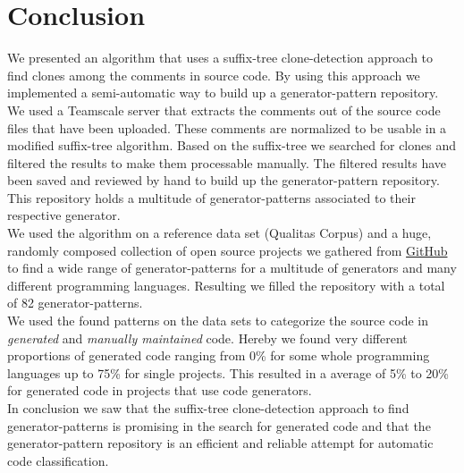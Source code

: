 
\chapter{Conclusion}\label{chapter:conclusion}
We presented an algorithm that uses a suffix-tree clone-detection approach to find clones among the comments in source code. By using this approach we implemented a semi-automatic way to build up a generator-pattern repository.\\
We used a Teamscale server that extracts the comments out of the source code files that have been uploaded. These comments are normalized to be usable in a modified suffix-tree algorithm. Based on the suffix-tree we searched for clones and filtered the results to make them processable manually. The filtered results have been saved and reviewed by hand to build up the generator-pattern repository. This repository holds a multitude of generator-patterns associated to their respective generator.\\
We used the algorithm on a reference data set (Qualitas Corpus) and a huge, randomly composed collection of open source projects we gathered from \href{https://github.com}{GitHub} to find a wide range of generator-patterns for a multitude of generators and many different programming languages. Resulting we filled the repository with a total of 82 generator-patterns.\\
We used the found patterns on the data sets to categorize the source code in \textit{generated} and \textit{manually maintained} code. Hereby we found very different proportions of generated code ranging from 0\% for some whole programming languages up to 75\% for single projects. This resulted in a average of 5\% to 20\% for generated code in projects that use code generators.\\
In conclusion we saw that the suffix-tree clone-detection approach to find generator-patterns is promising in the search for generated code and that the generator-pattern repository is an efficient and reliable attempt for automatic code classification.